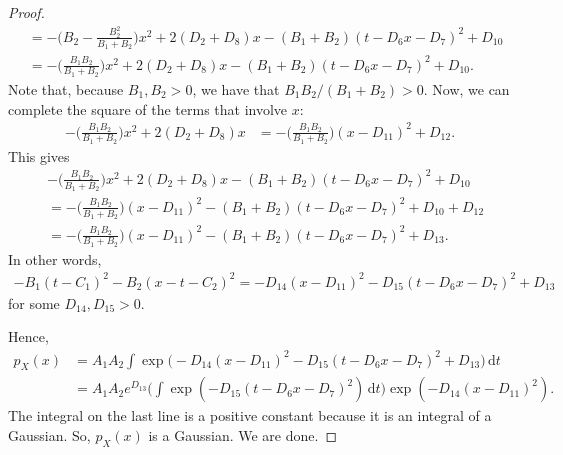 \documentclass[10pt]{article}
\newcommand{\dee}{\mathrm{d}}
\begin{document}
\begin{itemize}
\begin{proof}
\begin{align*}
      &= -\bigg( B_2 - \frac{B_2^2}{B_1 + B_2} \bigg) x^2  + 2(D_2 + D_8) x -(B_1 + B_2)( t - D_6 x - D_7)^2 + D_{10} \\
      &= -\bigg( \frac{B_1 B_2}{B_1 + B_2} \bigg) x^2  + 2(D_2 + D_8) x -(B_1 + B_2)( t - D_6 x - D_7)^2 + D_{10}.
    \end{align*}
    Note that, because $B_1, B_2 > 0$, we have that $B_1B_2/(B_1 + B_2) > 0$. Now, we can complete the square of the terms that involve $x$:
    \begin{align*}
      -\bigg( \frac{B_1 B_2}{B_1 + B_2} \bigg) x^2  + 2(D_2 + D_8) x
      &= -\bigg( \frac{B_1 B_2}{B_1 + B_2} \bigg)(x - D_{11})^2 + D_{12}.
    \end{align*}
    This gives
    \begin{align*}
      &-\bigg( \frac{B_1 B_2}{B_1 + B_2} \bigg) x^2  + 2(D_2 + D_8) x -(B_1 + B_2)( t - D_6 x - D_7)^2 + D_{10} \\
      &= -\bigg( \frac{B_1 B_2}{B_1 + B_2} \bigg)(x - D_{11})^2 -(B_1 + B_2)( t - D_6 x - D_7)^2 + D_{10} + D_{12} \\
      &= -\bigg( \frac{B_1 B_2}{B_1 + B_2} \bigg)(x - D_{11})^2 -(B_1 + B_2)( t - D_6 x - D_7)^2 + D_{13}.
    \end{align*}
    In other words,
    \begin{align*}
      -B_1(t-C_1)^2 - B_2(x - t - C_2)^2 = -D_{14}(x - D_{11})^2 - D_{15}(t - D_6x - D_7)^2 + D_{13}
    \end{align*}
    for some $D_{14}, D_{15} > 0$.

    Hence,
    \begin{align*}
      p_X(x) 
      &= A_1 A_2 \int \exp\big( -D_{14}(x - D_{11})^2 - D_{15}(t - D_6x - D_7)^2 + D_{13}  \big)\, \dee t \\
      &= A_1 A_2 e^{D_{13}} \bigg( \int \exp( - D_{15}(t - D_6x - D_7)^2 )\, \dee t \bigg) \exp(-D_{14}(x - D_{11})^2) .
    \end{align*}
    The integral on the last line is a positive constant because it is an integral of a Gaussian. So, $p_X(x)$ is a Gaussian. We are done.
  \end{proof}
\end{itemize}


  
\end{document}
